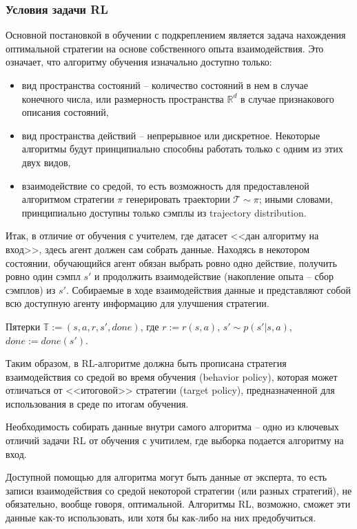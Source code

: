 \documentclass[%
	11pt,
	a4paper,
	utf8,
		]{article}
\begin{document}
\subsubsection{Условия задачи RL}

Основной постановкой в обучении с подкреплением является задача нахождения оптимальной стратегии на основе собственного опыта взаимодействия. Это означает, что алгоритму обучения изначально доступно только:
\begin{itemize}
	\item вид пространства состояний -- количество состояний в нем в случае конечного числа, или размерность пространства $ \mathbb{R}^d $ в случае признакового описания состояний,
	
	\item вид пространства действий -- непрерывное или дискретное. Некоторые алгоритмы будут принципиально способны работать только с одним из этих двух видов,
	
	\item взаимодействие со средой, то есть возможность для предоставленой алгоритмом стратегии $ \pi $ генерировать траектории $ \mathcal{T} \sim \pi $; иными словами, принципиально доступны только сэмплы из trajectory distribution.
\end{itemize}

Итак, в отличие от обучения с учителем, где датасет <<дан алгоритму на вход>>, здесь агент должен сам собрать данные. Находясь в некотором состоянии, обучающийся агент обязан выбрать ровно одно действие, получить ровно один сэмпл $ s' $ и продолжить взаимодействие (накопление опыта -- сбор сэмплов) из $ s' $. Собираемые в ходе взаимодействия данные и представляют собой всю доступную агенту информацию для улучшения стратегии.

Пятерки $ \mathbb{T} := (s, a, r, s', done) $, где $ r := r(s, a) $, $ s' \sim p(s' | s, a) $, $ done := done(s') $.

Таким образом, в RL-алгоритме должна быть прописана стратегия взаимодействия со средой во время обучения (behavior policy), которая может отличаться от <<итоговой>> стратегии (target policy), предназначенной для использования в среде по итогам обучения.

Необходимость собирать данные внутри самого алгоритма -- одно из ключевых отличий задачи RL от обучения с учитилем, где выборка подается алгоритму на вход.

Доступной помощью для алгоритма могут быть данные от эксперта, то есть записи взаимодействия со средой некоторой стратегии (или разных стратегий), не обязательно, вообще говоря, оптимальной. Алгоритмы RL, возможно, сможет эти данные как-то использовать, или хотя бы как-либо на них предобучиться.
\end{document}
